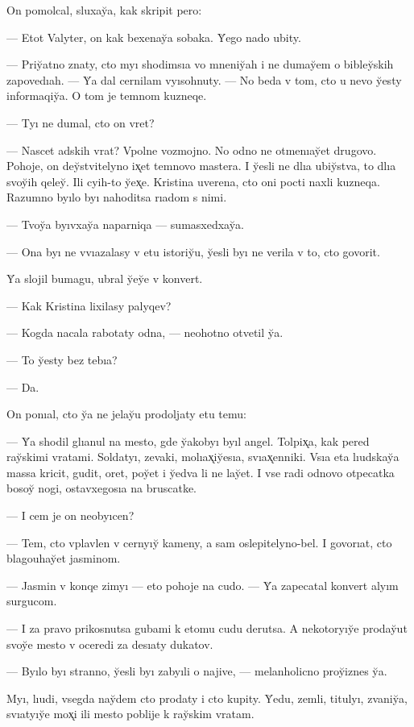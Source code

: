 \documentclass[10pt]{book}
\begin{document}
On pomolcal, sluxay̆a, kak skripit pero:

— Etot Valyter, on kak bexenay̆a sobaka. Y̆ego nado ubity.

— Priy̆atno znaty, cto myı shodimsıa vo mneniy̆ah i ne dumay̆em o bibley̆skih zapovedıah. — Y̆a dal cernilam vyısohnuty. — No beda v tom, cto u nevo y̆esty informaqiy̆a. O tom je temnom kuzneqe.

— Tyı ne dumal, cto on vret?

— Nascet adskih vrat? Vpolne vozmojno. No odno ne otmenıay̆et drugovo. Pohoje, on dey̆stvitelyno ix̨et temnovo mastera. I y̆esli ne dlıa ubiy̆stva, to dlıa svoy̆ih qeley̆. Ili cyih-to y̆ex̨e. Kristina uverena, cto oni pocti naxli kuzneqa. Razumno byılo byı nahoditsa rıadom s nimi.

— Tvoy̆a byıvxay̆a naparniqa — sumasxedxay̆a.

— Ona byı ne vvıazalasy v etu istoriy̆u, y̆esli byı ne verila v to, cto govorit.

Y̆a slojil bumagu, ubral y̆ey̆e v konvert.

— Kak Kristina lixilasy palyqev?

— Kogda nacala rabotaty odna, — neohotno otvetil y̆a.

— To y̆esty bez tebıa?

— Da.

On ponıal, cto y̆a ne jelay̆u prodoljaty etu temu:

— Y̆a shodil glıanul na mesto, gde y̆akobyı byıl angel. Tolpix̨a, kak pered ray̆skimi vratami. Soldatyı, zevaki, molıax̨iy̆esıa, svıax̨enniki. Vsıa eta lıudskay̆a massa kricit, gudit, oret, poy̆et i y̆edva li ne lay̆et. I vse radi odnovo otpecatka bosoy̆ nogi, ostavxegosıa na bruscatke.

— I cem je on neobyıcen?

— Tem, cto vplavlen v cernyıy̆ kameny, a sam oslepitelyno-bel. I govorıat, cto blagouhay̆et jasminom.

— Jasmin v konqe zimyı — eto pohoje na cudo. — Y̆a zapecatal konvert alyım surgucom.

— I za pravo prikosnutsa gubami k etomu cudu derutsa. A nekotoryıy̆e proday̆ut svoy̆e mesto v oceredi za desıaty dukatov.

— Byılo byı stranno, y̆esli byı zabyıli o najive, — melanholicno proy̆iznes y̆a.

Myı, lıudi, vsegda nay̆dem cto prodaty i cto kupity. Y̆edu, zemli, titulyı, zvaniy̆a, svıatyıy̆e mox̨i ili mesto poblije k ray̆skim vratam.
\end{document}
